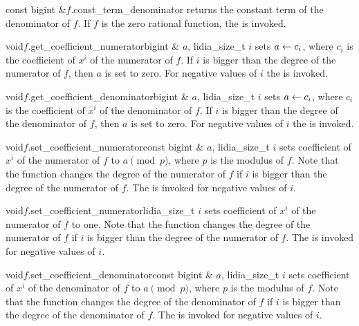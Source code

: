 \begin{cfcode}{const bigint &}{$f$.const_term_denominator}{}
  returns the constant term of the denominator of $f$.  If $f$ is the zero rational function,
  the \LEH is invoked.
\end{cfcode}

\begin{cfcode}{void}{$f$.get_coefficient_numerator}{bigint & $a$, lidia_size_t $i$}
  sets $a \leftarrow c_i$, where $c_i$ is the coefficient of $x^i$ of the numerator of $f$.  If $i$
  is bigger than the degree of the numerator of $f$, then $a$ is set to zero.  For negative
  values of $i$ the \LEH is invoked.
\end{cfcode}

\begin{cfcode}{void}{$f$.get_coefficient_denominator}{bigint & $a$, lidia_size_t $i$}
  sets $a \leftarrow c_i$, where $c_i$ is the coefficient of $x^i$ of the denominator of $f$.  If
  $i$ is bigger than the degree of the denominator of $f$, then $a$ is set to zero.  For
  negative values of $i$ the \LEH is invoked.
\end{cfcode}

\begin{fcode}{void}{$f$.set_coefficient_numerator}{const bigint & $a$, lidia_size_t $i$}
  sets coefficient of $x^i$ of the numerator of $f$ to $a \pmod{p}$, where $p$ is the modulus of
  $f$.  Note that the function changes the degree of the numerator of $f$ if $i$ is bigger than
  the degree of the numerator of $f$.  The \LEH is invoked for negative values of $i$.
\end{fcode}

\begin{fcode}{void}{$f$.set_coefficient_numerator}{lidia_size_t $i$}
  sets coefficient of $x^i$ of the numerator of $f$ to one.  Note that the function changes the
  degree of the numerator of $f$ if $i$ is bigger than the degree of the numerator of $f$.  The
  \LEH is invoked for negative values of $i$.
\end{fcode}

\begin{fcode}{void}{$f$.set_coefficient_denominator}{const bigint & $a$, lidia_size_t $i$}
  sets coefficient of $x^i$ of the denominator of $f$ to $a \pmod{p}$, where $p$ is the modulus
  of $f$.  Note that the function changes the degree of the denominator of $f$ if $i$ is bigger
  than the degree of the denominator of $f$.  The \LEH is invoked for negative values of $i$.
\end{fcode}

